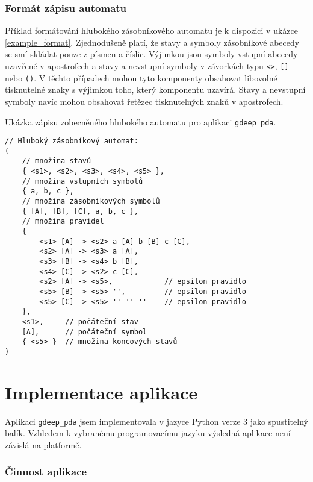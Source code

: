 \subsubsection{Formát zápisu automatu}\label{kap_aplikace_format}

Příklad formátování hlubokého zásobníkového automatu je k dispozici v ukázce \ref{example_format}. Zjednodušeně platí, že
stavy a symboly zásobníkové abecedy se smí skládat pouze z písmen a číslic. Výjimkou jsou symboly vstupní abecedy uzavřené v apostrofech a stavy a nevstupní symboly v závorkách typu \texttt{<>}, \texttt{[]} nebo \texttt{()}. V těchto případech mohou tyto komponenty obsahovat libovolné tisknutelné znaky s výjimkou toho, který komponentu uzavírá. Stavy a nevstupní symboly navíc mohou obsahovat řetězec tisknutelných znaků v apostrofech.


\begin{Example} \label{example_format}
Ukázka zápisu zobecněného hlubokého automatu pro aplikaci \texttt{gdeep\_pda}.

\begin{verbatim}
// Hluboký zásobníkový automat:
(
    // množina stavů
    { <s1>, <s2>, <s3>, <s4>, <s5> },
    // množina vstupních symbolů
    { a, b, c },
    // množina zásobníkových symbolů
    { [A], [B], [C], a, b, c },
    // množina pravidel
    { 
        <s1> [A] -> <s2> a [A] b [B] c [C],
        <s2> [A] -> <s3> a [A],
        <s3> [B] -> <s4> b [B],
        <s4> [C] -> <s2> c [C],
        <s2> [A] -> <s5>,            // epsilon pravidlo
        <s5> [B] -> <s5> '',         // epsilon pravidlo
        <s5> [C] -> <s5> '' '' ''    // epsilon pravidlo
    },
    <s1>,     // počáteční stav
    [A],      // počáteční symbol
    { <s5> }  // množina koncových stavů	
)
\end{verbatim}
\end{Example}

\section{Implementace aplikace}

Aplikaci \texttt{gdeep\_pda} jsem implementovala v jazyce Python verze 3 jako spustitelný balík. Vzhledem k vybranému programovacímu jazyku výsledná aplikace není závislá na platformě.


\subsubsection{Činnost aplikace}

